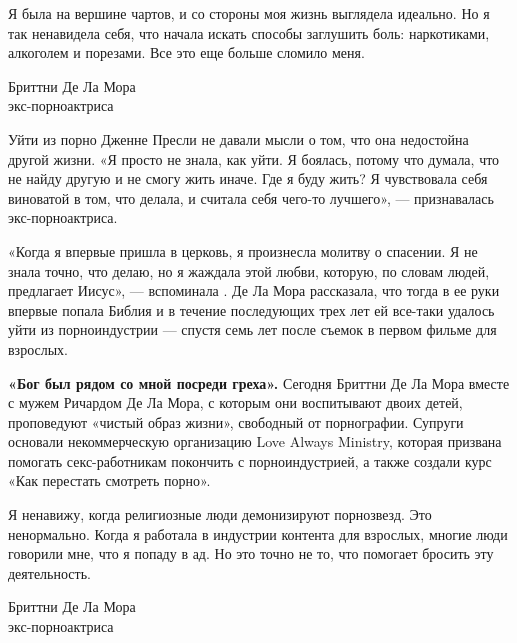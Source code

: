 \begin{fancyquotes}
    Я была на вершине чартов, и со стороны моя жизнь выглядела идеально. Но я так ненавидела себя, что начала искать способы заглушить боль: наркотиками, алкоголем и порезами. Все это еще больше сломило меня.\\

    \begin{flushright}
        Бриттни Де Ла Мора\\
        экс-порноактриса
    \end{flushright}
\end{fancyquotes}

Уйти из порно Дженне Пресли не давали мысли о том, что она недостойна другой жизни. «Я просто не знала, как уйти. Я боялась, потому что думала, что не найду другую  и не смогу жить иначе. Где я буду жить? Я чувствовала себя виноватой в том, что делала, и считала себя  чего-то лучшего», --- признавалась экс-порноактриса.

«Когда я впервые пришла в церковь, я произнесла молитву о спасении. Я не знала точно, что делаю, но я жаждала этой любви, которую, по словам людей, предлагает Иисус», --- вспоминала . Де Ла Мора рассказала, что тогда в ее руки впервые попала Библия и в течение последующих трех лет ей все-таки удалось уйти из порноиндустрии --- спустя семь лет после съемок в первом фильме для взрослых.

\textbf{«Бог был рядом со мной посреди греха».} Сегодня Бриттни Де Ла Мора вместе с мужем Ричардом Де Ла Мора, с которым они воспитывают двоих детей, проповедуют «чистый образ жизни», свободный от порнографии. Супруги основали некоммерческую организацию Love Always Ministry, которая призвана помогать секс-работникам покончить с порноиндустрией, а также создали курс «Как перестать смотреть порно».


\begin{fancyquotes}
    Я ненавижу, когда религиозные люди демонизируют порнозвезд. Это ненормально. Когда я работала в индустрии контента для взрослых, многие люди говорили мне, что я попаду в ад. Но это точно не то, что помогает бросить эту деятельность.\\

    \begin{flushright}
        Бриттни Де Ла Мора\\
        экс-порноактриса
    \end{flushright}
\end{fancyquotes}

